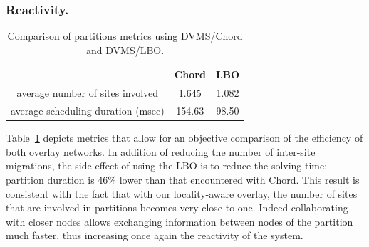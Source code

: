 


\subsubsection{Reactivity.}
\begin{table}[t!]

  \begin{center}
    \begin{tabular}{|c|c|c|}   

      \hline \multicolumn{1}{|p{3cm}|}{ }
       & \multicolumn{1}{|p{3cm}|}{\centering Chord }  & \multicolumn{1}{|p{3cm}|}{ \centering LBO}  \\

      \hline
      average number of sites involved & 1.645 & 1.082 \\

      \hline
      average scheduling duration (msec) & 154.63 & 98.50 \\

      \hline
    \end{tabular}
  \end{center}
  \caption{\label{partitions_table} Comparison of partitions metrics
    using DVMS/Chord and DVMS/LBO.}
  \vspace{-0.3cm}
\end{table}


Table~\ref{partitions_table} depicts metrics that allow for an objective 
comparison of the efficiency of both overlay networks. In addition of reducing 
the number of inter-site migrations, the side effect of using the LBO is to 
reduce the solving time: partition duration is 46\% lower than that encountered 
with Chord. This result is consistent with the fact that with our locality-aware
overlay, the number of sites that are involved in partitions becomes very close 
to one. Indeed collaborating with closer nodes allows exchanging information between
nodes of the partition much faster, thus increasing once again the reactivity
of the system.

% 
